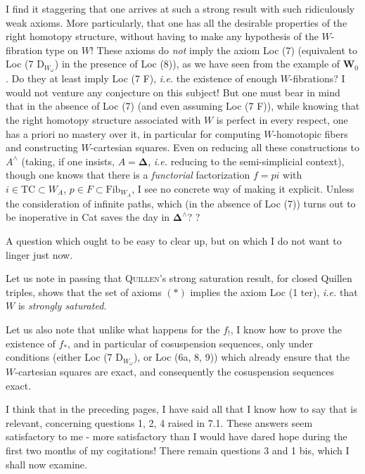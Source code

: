 I find it staggering that one arrives at such a strong result with such ridiculously weak axioms. More particularly, that one has all the desirable properties of the right homotopy structure, without having to make any hypothesis of the $W$-fibration type on $W$! These axioms do \textit{not} imply the axiom Loc (7) (equivalent to Loc (7 $\mathrm{D}_{W_\omega}$) in the presence of Loc (8)), as we have seen from the example of $\mathbf{W}_0$. Do they at least imply Loc (7 F), \textit{i.e.} the existence of enough $W$-fibrations? I would not venture any conjecture on this subject! But one must bear in mind that in the absence of Loc (7) (and even
assuming Loc (7 F)), while knowing that the right homotopy structure associated with $W$ is perfect in every respect, one has a priori no mastery over it, in particular for computing $W$-homotopic fibers and constructing $W$-cartesian squares. Even on reducing all these constructions to $A^\wedge$ (taking, if one insists, $A = \boldsymbol{\Delta}$, \textit{i.e.} reducing to the semi-simplicial context), though one knows that there is a \textit{functorial} factorization $f = pi$ with $i \in \mathrm{TC} \subset W_A$, $p \in F \subset \mathrm{Fib}_{W_A}$, I see no concrete way of making it explicit. Unless the consideration of infinite paths, which (in the absence of Loc (7)) turns out to be inoperative in Cat saves the day in $\boldsymbol{\Delta}^\wedge$? ?

A question which ought to be easy to clear up, but on which I do not want to linger just now.

Let us note in passing that \textsc{Quillen}'s strong saturation result, for closed Quillen triples, shows that the set of axioms $(*)$ implies the axiom Loc (1 ter), \textit{i.e.} that $W$ is \textit{strongly saturated.}

Let us also note that unlike what happens for the $f_!$, I know how to prove the existence of $f_*$, and in particular of cosuspension sequences, only under conditions (either Loc (7 $\mathrm{D}_{W_\omega}$), or Loc (6a, 8, 9)) which already ensure that the $W$-cartesian squares are exact, and consequently the cosuspension sequences exact.

I think that in the preceding pages, I have said all that I know how to say that is relevant, concerning questions 1, 2, 4 raised in 7.1. These answers seem satisfactory to me - more satisfactory than I would have dared hope during the first two months of my cogitations! There remain questions 3 and 1 bis, which I shall now examine.

